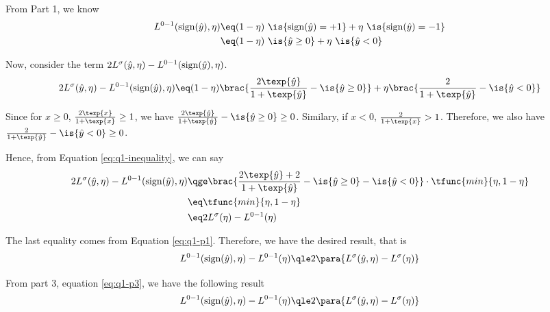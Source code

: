 \documentclass[a4paper,10pt]{article}
\begin{document}
\begin{question}
	\begin{qpart}{3}

		From Part 1, we know
		\begin{align*}
			L^{0-1}(\sgn(\wy), \eta)	&\eq	(1 - \eta)\ \is{\sgn(\wy) = +1} + \eta\ \is{\sgn(\wy) = -1} \\
			&\eq	(1 - \eta)\ \is{\wy \ge 0} + \eta\ \is{\wy < 0}
		\end{align*}

		Now, consider the term $2L^{\sigma}(\hat{y}, \eta) - L^{0-1}(\text{sign}(\hat{y}), \eta)$.
		\begin{align*}
			2L^{\sigma}(\wy, \eta) - L^{0-1}(\sgn(\wy), \eta)	\eq	(1 - \eta) \brac{\frac{2 \texp{\wy}}{1 + \texp{\wy}} - \is{\wy \ge 0}} + \eta \brac{\frac{2}{1 + \texp{\wy}} - \is{\wy < 0}} \\
		\end{align*}

		Since for $x \ge 0$, $\frac{2 \texp{x}}{1 + \texp{x}} \ge 1$, we have $\frac{2 \texp{\wy}}{1 + \texp{\wy}} - \is{\wy \ge 0} \ge 0$. Similary, if $x < 0$, $\frac{2}{1 + \texp{x}} > 1$. Therefore, we also have $\frac{2}{1 + \texp{\wy}} - \is{\wy < 0} \ge 0$.

		Hence, from Equation \ref{eq:q1-inequality}, we can say
		\begin{align*}
			2L^{\sigma}(\wy, \eta) - L^{0-1}(\sgn(\wy), \eta)	&\qge	\brac{\frac{2 \texp{\wy} + 2}{1 + \texp{\wy}} - \is{\wy \ge 0} - \is{\wy < 0}} \cdot \tfunc{min}{\eta, 1 - \eta} \\
			&\eq	\tfunc{min}{\eta, 1 - \eta} \\
			&\eq	2 L^{\sigma}(\eta) - L^{0-1}(\eta)
		\end{align*}

		The last equality comes from Equation \ref{eq:q1-p1}. Therefore, we have the desired result, that is
		\begin{equation}
			L^{0-1}(\sgn(\wy), \eta) - L^{0-1}(\eta)	\qle	2 \para{L^{\sigma}(\wy, \eta) - L^{\sigma}(\eta)}
			\label{eq:q1-p3}
		\end{equation}

	\end{qpart}

	\begin{qpart}{4}

		From part 3, equation \ref{eq:q1-p3}, we have the following result
		\begin{align*}
			L^{0-1}(\sgn(\wy), \eta) - L^{0-1}(\eta)	\qle	2 \para{L^{\sigma}(\wy, \eta) - L^{\sigma}(\eta)}
		\end{align*}


\end{qpart}
\end{question}
\end{document}
